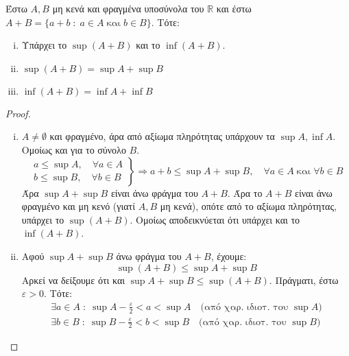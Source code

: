 \begin{mybox3}
  \begin{prop}
    Έστω $ A,B $ μη κενά και φραγμένα υποσύνολα του $ \mathbb{R} $ και έστω 
    $ A+B= \{ a+b \; : \; a \in A \; \text{και} \; b \in B \} $.
    Τότε:
    \begin{enumerate}[i)]
      \item Υπάρχει το $ \sup (A+B) $ και το $ \inf (A+B) $.
      \item $ \sup {(A+B)}= \sup A + \sup B $
      \item $ \inf {(A+B)}= \inf A + \inf B $
    \end{enumerate}
  \end{prop}
\end{mybox3}
\begin{proof}
\item {}
  \begin{enumerate}[i)]
    \item $ A \neq \emptyset $ και φραγμένο, άρα από αξίωμα πληρότητας υπάρχουν τα 
      $ \sup A, \inf A $. Ομοίως και για το σύνολο $B$.
      \[
        \left.
          \begin{aligned}
            a \leq \sup A, \quad \forall a \in A \\
            b \leq \sup B, \quad \forall b \in B 
          \end{aligned}
        \right\} \Rightarrow a+b \leq \sup A + \sup B, \quad \forall a \in A 
        \; \text{και} \; \forall b \in B
      \]
      Άρα $ \sup A + \sup B $ είναι άνω φράγμα του $ A+B $. Άρα το $ A+B $ είναι 
      άνω φραγμένο και μη κενό (γιατί $A,B$ μη κενά), οπότε από το αξίωμα πληρότητας, 
      υπάρχει το $ \sup {(A+B)} $. Ομοίως αποδεικνύεται ότι υπάρχει και το 
      $ \inf {(A+B)} $. 
    \item Αφού $ \sup A + \sup B $ άνω φράγμα του $ A+B $, έχουμε:
      \begin{equation}\label{eq:supsum1}
        \sup {(A+B)} \leq \sup A + \sup B 
      \end{equation} 
      Αρκεί να δείξουμε ότι και $ \sup A + \sup B \leq \sup {(A+B)} $. Πράγματι, έστω 
      $ \varepsilon > 0 $. Τότε:
      \[
        \left.
          \begin{aligned} 
            \exists a \in A \; : \; \sup A - \frac{\varepsilon}{2} < a < \sup A 
            \quad \text{(από χαρ. ιδιοτ.\ του $\sup A$)} \\
            \exists b \in B \; : \; \sup B - \frac{\varepsilon}{2} < b < \sup B 
            \quad \text{(από χαρ. ιδιοτ.\ του $\sup B$)} 

\end{aligned}\]
\end{enumerate}
\end{proof}
